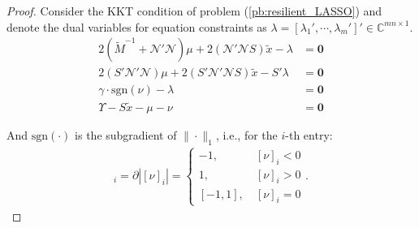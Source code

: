 \documentclass[12pt]{article}
\newcommand{\Cb}{{\mathbb{C}}}
\newcommand{\Nc}{{\mathcal{N}}}
\newcommand{\sgn}{\text{sgn}}
\newtheorem*{proof}{\textbf{Proof}}
\begin{document}
\begin{proof}
Consider the KKT condition of problem (\ref{pb:resilient_LASSO}) and denote the dual variables for equation constraints as $\lambda=[\lambda_1{'},\cdots,\lambda_m{'}]{'}\in \Cb^{mn\times 1}$. 	
\begin{align}
	2(\tilde{M}^{-1}+\Nc{'}\Nc)\mu+2(\Nc{'} \Nc S)\tilde{x} - \lambda &= \mathbf{0} \label{eq:KKT1}\\
	2(S{'} \Nc{'}\Nc)\mu+2(S{'} \Nc{'} \Nc S)\tilde{x} -  S{'}\lambda &= \mathbf{0} \label{eq:KKT2} \\
	\gamma \cdot  \sgn(\nu) - \lambda &= \mathbf{0} \label{eq:KKT3} \\
	\Upsilon - S \tilde{x} - \mu - \nu &= \mathbf{0}  \label{eq:KKT4}
\end{align}

And $\sgn(\cdot)$ is the subgradient of $\|\cdot\|_1$, i.e., for the $i$-th entry:
\begin{align*}
	[\sgn(\nu)]_i=\partial |[\nu]_i|=
	\left\{
	\begin{array}{cc}
		-1 ,& \ [\nu]_i<0 \\
		1 , &\ [\nu]_i>0  \\
	\left[-1,1\right],& \ [\nu]_i=0 
	\end{array}
\right. .
\end{align*}


\end{proof}
\end{document}
